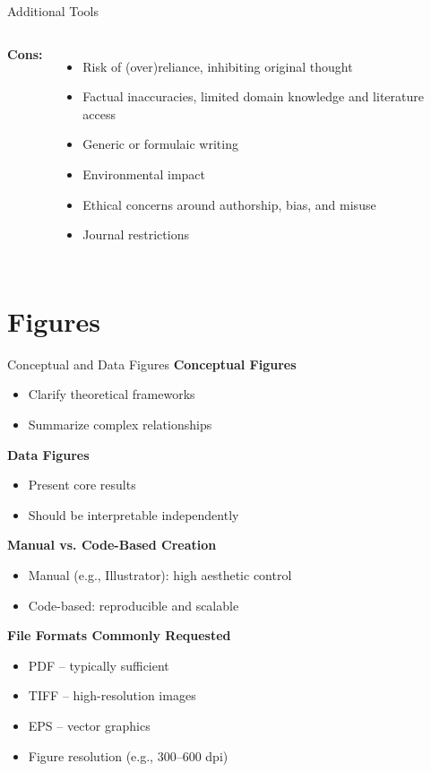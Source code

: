 \documentclass{beamer}
\begin{document}
\begin{frame}{Additional Tools}
\begin{columns}[T, totalwidth=\textwidth]
    {\fontsize{8pt}{9pt}\selectfont
    \textbf{Cons:}
    \begin{itemize}
        \item Risk of (over)reliance, inhibiting original thought
        \item Factual inaccuracies, limited domain knowledge and literature access
        \item Generic or formulaic writing
        \item Environmental impact
        \item Ethical concerns around authorship, bias, and misuse
        \item Journal restrictions
    \end{itemize}
    }
\end{columns}

\end{frame}

\section{Figures}
\footnotesize

\begin{frame}{Conceptual and Data Figures}
\textbf{Conceptual Figures}
\begin{itemize}
    \item Clarify theoretical frameworks
    \item Summarize complex relationships
\end{itemize}

\textbf{Data Figures}
\begin{itemize}
    \item Present core results
    \item Should be interpretable independently
\end{itemize}

\textbf{Manual vs. Code-Based Creation}
\begin{itemize}
    \item Manual (e.g., Illustrator): high aesthetic control
    \item Code-based: reproducible and scalable
\end{itemize}

\textbf{File Formats Commonly Requested}
\begin{itemize}
    \item PDF – typically sufficient
    \item TIFF – high-resolution images
    \item EPS – vector graphics
    \item Figure resolution (e.g., 300–600 dpi)
\end{itemize}

\end{frame}
\end{document}
